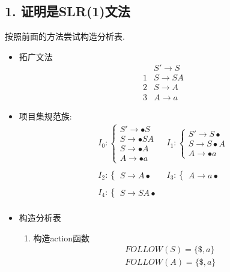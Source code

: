 \documentclass[UTF8]{article}
\newcommand{\blt}{\bullet}
\begin{document}
\subsection*{1. 证明是SLR(1)文法}
按照前面的方法尝试构造分析表.
\begin{itemize}
\item 拓广文法
	$$\begin{array}{ll}
	  & S'\rightarrow S\\
	1 & S\rightarrow SA\\
	2 & S\rightarrow A\\
	3 & A\rightarrow a
	\end{array}$$
\item 项目集规范族:
	$$\begin{array}{ll}
	I_0:
		\left\{\begin{array}{l}
		S'\rightarrow \blt S\\
		S\rightarrow \blt SA\\
		S\rightarrow\blt A\\
		A\rightarrow \blt a
		\end{array}\right.
	&
	I_1:
		\left\{\begin{array}{l}
		S'\rightarrow S\blt\\
		S\rightarrow S\blt A\\
		A\rightarrow \blt a
		\end{array}\right.
	\\\\
	I_2:
		\left\{\begin{array}{l}
		S\rightarrow A\blt
		\end{array}\right.
	&
	I_3:
		\left\{\begin{array}{l}
		A\rightarrow a\blt
		\end{array}\right.
	\\\\
	I_4:
		\left\{\begin{array}{l}
		S\rightarrow SA\blt
		\end{array}\right.
	\\
	\end{array}$$
\item 构造分析表
	\begin{enumerate}[(1) ]
	\item 构造action函数
		$$\begin{array}{l}
		FOLLOW(S)=\{\$,a\}\\
		FOLLOW(A)=\{\$,a\}
		\end{array}$$
		\begin{center}
		\begin{tabular}{|c|c|c|}

\end{tabular}
\end{center}
\end{enumerate}
\end{itemize}
\end{document}
